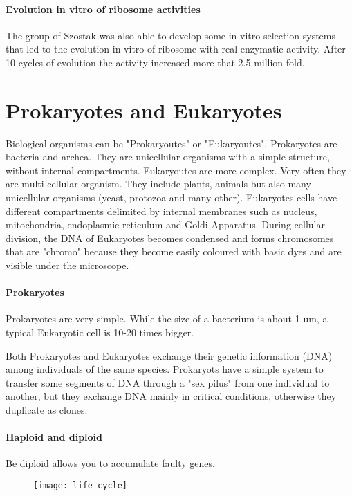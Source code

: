 \paragraph*{Evolution in vitro of ribosome activities}
The group of Szostak was also able to develop some in vitro selection systems
that led to the evolution in vitro of ribosome with real enzymatic activity.
After 10 cycles of evolution the activity increased more that 2.5 million fold.

\section{Prokaryotes and Eukaryotes}
Biological organisms can be "Prokaryoutes" or "Eukaryoutes". Prokaryotes are
bacteria and archea. They are unicellular organisms with a simple structure,
without internal compartments. Eukaryoutes are more complex. Very often they are
multi-cellular organism. They include plants, animals but also many unicellular
organisms (yeast, protozoa and many other). Eukaryotes cells have different
compartments delimited by internal membranes such as nucleus, mitochondria,
endoplasmic reticulum and Goldi Apparatus. During cellular division, the DNA
of Eukaryotes becomes condensed and forms chromosomes that are "chromo" because
they become easily coloured with basic dyes and are visible under the
microscope.

\paragraph*{Prokaryotes} Prokaryotes are very simple. While the size of a
bacterium is about 1 um, a typical Eukaryotic cell is 10-20 times bigger.

Both Prokaryotes and Eukaryotes exchange their genetic information (DNA)
among individuals of the same species. Prokaryots have a simple system to
transfer some segments of DNA through a "sex pilus" from one individual to
another, but they exchange DNA mainly in critical conditions, otherwise they
duplicate as clones.

\paragraph*{Haploid and diploid}
Be diploid allows you to accumulate faulty genes.

\begin{figure}[H]
  \centering
  \texttt{[image: life\_cycle]}
\end{figure}


